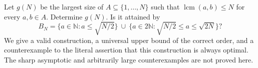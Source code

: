 Let $g(N)$ be the largest size of $A\subseteq\{1,\ldots,N\}$ such that $\operatorname{lcm}(a,b)\le N$ for every $a,b\in A$. Determine $g(N)$. Is it attained by
\[B_N=\{a\in\mathbb N:a\le\sqrt{N/2}\}
\ \cup\ \{a\in2\mathbb N:\sqrt{N/2}\le a\le\sqrt{2N}\}?\]
We give a valid construction, a universal upper bound of the correct order, and a counterexample to the literal assertion that this construction is always optimal. The sharp asymptotic and arbitrarily large counterexamples are not proved here.

